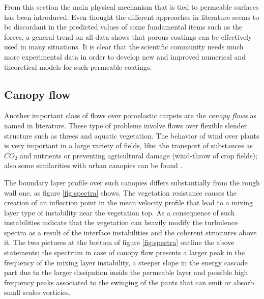 From this section the main physical mechanism that is tied to permeable surfaces has been introduced.
Even thought the different approaches in literature seems to be discordant in the predicted values of some fundamental items such as the forces, a general trend on all  data shows that porous coatings can be effectively used in many situations.
Ii is clear that the scientific community needs much more experimental data in order to develop new and improved numerical and theoretical models for such permeable coatings.

\subsection{Canopy flow}

Another important class of flows over poroelastic carpets are the \textit{canopy flows} as named in literature.
These type of problems involve flows over flexible slender structure such as threes and aquatic vegetation.
The behavior of wind over plants is very important in a large variety of fields, like: the transport of substances as $CO_2$ and nutrients or preventing agricultural damage (wind-throw of crop fields); also some similarities with urban canopies can be found \citet{ghisalberti2009obstructed}.

The boundary layer profile over such canopies differs substantially from the rough wall one, as figure \ref{fig:spectra} shows.
The vegetation resistance causes the creation of an inflection point in the mean velocity profile that lead to a mixing layer type of instability near the vegetation top.
As a consequence of such instabilities \citet{finnigan2000turbulence} indicate that the vegetation can heavily modify the turbulence spectra as a result of the interface instabilities and the coherent structures above it.
The two pictures at the bottom of figure \ref{fig:spectra} outline the above statements; the spectrum in case of canopy flow presents a larger peak in the frequency of the mixing layer instability, a steeper slope in the energy cascade part due to the larger dissipation inside the permeable layer and possible high frequency peaks associated to the swinging of the pants that can emit or absorb small scales vorticies.
 
